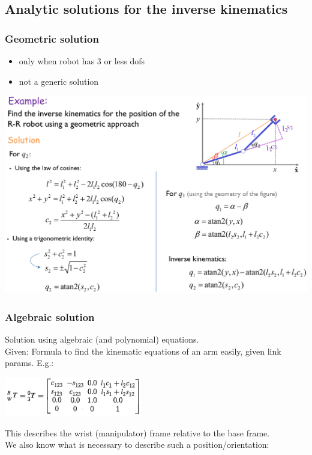 \subsection{Analytic solutions for the inverse kinematics}
\subsubsection{Geometric solution}
\begin{itemize}
	\item only when robot has 3 or less dofs
	\item not a generic solution
\end{itemize}

{\centering 
\includegraphics[width=15cm]{sections/imgs/14.png}
\\}

\subsubsection{Algebraic solution}
Solution using algebraic (and polynomial) equations.\\
Given: Formula to find the kinematic equations of an arm easily, given link params. E.g.:

{\centering 
\includegraphics[width=6cm]{sections/imgs/15.png}
\\}

This describes the wrist (manipulator) frame relative to the base frame.\\
We also know what is necessary to describe such a position/orientation:

